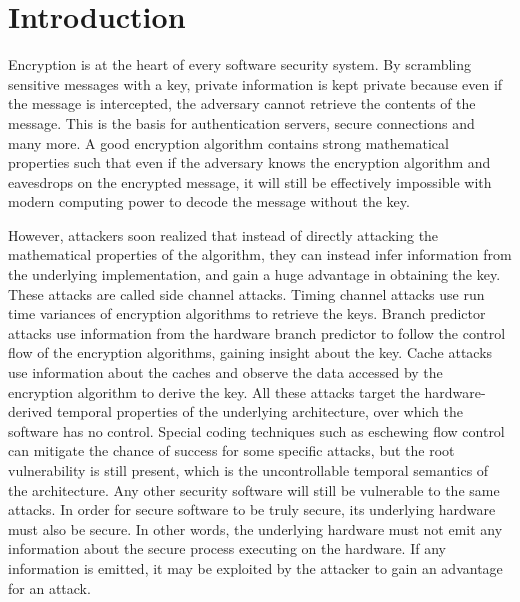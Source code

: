 \documentclass[times, 10pt,twocolumn]{article}
\begin{document}
\section{Introduction}
Encryption is at the heart of every software security system. By scrambling sensitive messages with a key, private information is kept private because even if the message is intercepted, the adversary cannot retrieve the contents of the message. This is the basis for authentication servers, secure connections and many more. A good encryption algorithm contains strong mathematical properties such that even if the adversary knows the encryption algorithm and eavesdrops on the encrypted message, it will still be effectively impossible with modern computing power to decode the message without the key.

However, attackers soon realized that instead of directly attacking the mathematical properties of the algorithm, they can instead infer information from the underlying implementation, and gain a huge advantage in obtaining the key. These attacks are called side channel attacks. Timing channel attacks use run time variances of encryption algorithms to retrieve the keys. Branch predictor attacks use information from the hardware branch predictor to follow the control flow of the encryption algorithms, gaining insight about the key. Cache attacks use information about the caches and observe the data accessed by the encryption algorithm to derive the key. All these attacks target the hardware-derived temporal properties of the underlying architecture, over which the software has no control.  Special coding techniques such as eschewing flow control can mitigate the chance of success for some specific attacks, but the root vulnerability is still present, which is the uncontrollable temporal semantics of the architecture. Any other security software will still be vulnerable to the same attacks. In order for secure software to be truly secure, its underlying hardware must also be secure. In other words, the underlying hardware must not emit any information about the secure process executing on the hardware. If any information is emitted, it may be exploited by the attacker to gain an advantage for an attack.
\end{document}
